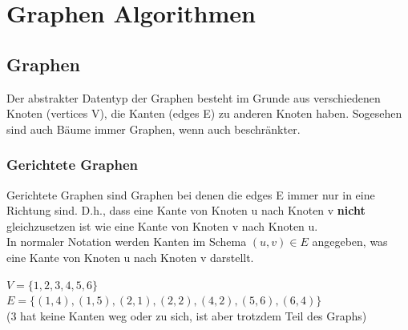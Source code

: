 \documentclass[
../AuD-Zusammenfassung.tex,
]
{subfiles}
\begin{document}
\section{Graphen Algorithmen}
\subsection{Graphen}
Der abstrakter Datentyp der Graphen besteht im Grunde aus verschiedenen Knoten (vertices V), die Kanten (edges E) zu anderen Knoten haben. Sogesehen sind auch Bäume immer Graphen, wenn auch beschränkter.
\subsubsection{Gerichtete Graphen}
Gerichtete Graphen sind Graphen bei denen die edges E immer nur in eine Richtung sind. D.h., dass eine Kante von Knoten u nach Knoten v \textbf{nicht} gleichzusetzen ist wie eine Kante von Knoten v nach Knoten u. \\
In normaler Notation werden Kanten im Schema $(u,v)\in E$ angegeben, was eine Kante von Knoten u nach Knoten v darstellt.

\begin{minipage}[t]{\textwidth}
    \centering
    $V = \{1,2,3,4,5,6\}$\\
    $E = \{(1,4),(1,5),(2,1),(2,2),(4,2),(5,6),(6,4)\}$\\
    (3 hat keine Kanten weg oder zu sich, ist aber trotzdem Teil des Graphs)
\end{minipage}
\end{document}
